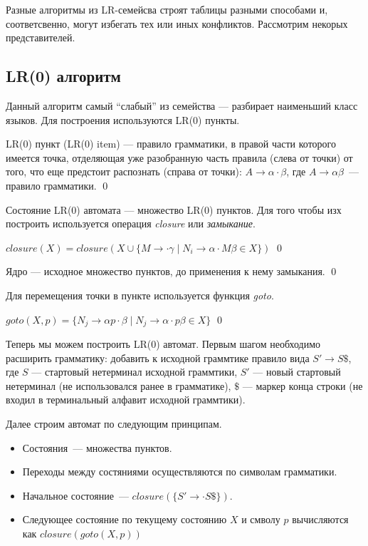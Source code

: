 Разные алгоритмы из LR-семейсва строят таблицы разными способами и, соответсвенно, могут избегать тех или иных конфликтов. Рассмотрим некорых представителей.

\subsection{LR(0) алгоритм}

Данный алгоритм самый ``слабый'' из семейства --- разбирает наименьший класс языков.
Для построения используются LR(0) пункты.

\begin{definition}
LR(0) пункт (LR(0) item) --- правило грамматики, в правой части которого имеется точка, отделяющая уже разобранную часть правила (слева от точки) от того, что еще предстоит распознать (справа от точки): $A \to \alpha \cdot \beta$, где $A \to \alpha \beta$~--- правило грамматики.
\qed
\end{definition}

Состояние LR(0) автомата --- множество LR(0) пунктов. Для того чтобы изх построить используется операция \textit{closure} или \textit{замыкание}. 

\begin{definition}
$closure(X)  = closure(X \cup \{M \rightarrow \cdot \gamma \mid N_i \rightarrow \alpha\cdot M\beta \in X \})$
\qed 
\end{definition}

\begin{definition}
Ядро --- исходное множество пунктов, до применения к нему замыкания.
\qed
\end{definition}

Для перемещения точки в пункте используется функция \textit{goto}.

\begin{definition}
$goto(X,p)  = \{N_j \rightarrow \alpha p \cdot \beta \mid N_j \rightarrow \alpha\cdot p\beta \in X \}$
\qed 
\end{definition}

Теперь мы можем построить LR(0) автомат.
Первым шагом необходимо расширить грамматику: добавить к исходной граммтике правило вида $S' \to S \$$, где $S$ --- стартовый нетерминал исходной граммтики, $S'$ --- новый стартовый нетерминал (не использовался ранее в грамматике), $\$$ --- маркер конца строки (не входил в терминальный алфавит исходной граммтики).

Далее строим автомат по следующим принципам.

\begin{itemize}
    \item Состояния~--- множества пунктов.
    \item Переходы между состяниями осуществляются по символам грамматики.
    \item Начальное состояние~--- $closure(\{S'\to 
    \cdot S \$\})$. 
    \item Следующее состояние по текущему состоянию $X$ и смволу $p$ вычисляются как $closure(goto(X, p))$
  \end{itemize}

